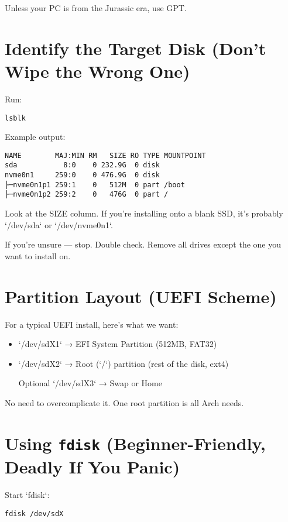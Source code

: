 \documentclass[12pt,openany]{book}
\begin{document}
Unless your PC is from the Jurassic era, use GPT.

\section{Identify the Target Disk (Don't Wipe the Wrong One)}

Run:

\begin{lstlisting}
lsblk
\end{lstlisting}

Example output:

\begin{lstlisting}
NAME        MAJ:MIN RM   SIZE RO TYPE MOUNTPOINT
sda           8:0    0 232.9G  0 disk
nvme0n1     259:0    0 476.9G  0 disk
├─nvme0n1p1 259:1    0   512M  0 part /boot
├─nvme0n1p2 259:2    0   476G  0 part /
\end{lstlisting}

Look at the SIZE column. If you're installing onto a blank SSD, it's probably `/dev/sda` or `/dev/nvme0n1`.

If you’re unsure — stop. Double check. Remove all drives except the one you want to install on.

\section{Partition Layout (UEFI Scheme)}

For a typical UEFI install, here’s what we want:

\begin{itemize}
  \item `/dev/sdX1` → EFI System Partition (512MB, FAT32)
  \item `/dev/sdX2` → Root (`/`) partition (rest of the disk, ext4)
  \item [Optional] `/dev/sdX3` → Swap or Home
\end{itemize}

No need to overcomplicate it. One root partition is all Arch needs.

\section{Using \texttt{fdisk} (Beginner-Friendly, Deadly If You Panic)}

Start `fdisk`:

\begin{lstlisting}
fdisk /dev/sdX
\end{lstlisting}
\end{document}
